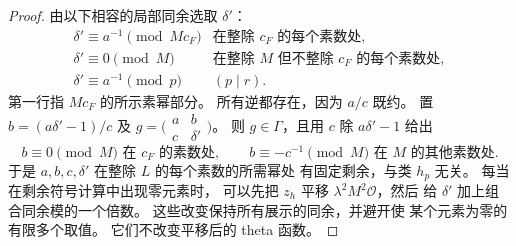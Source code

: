\begin{proof}
由以下相容的局部同余选取 $\delta'$：
\[
 \begin{array}{ll}
 \delta'\equiv a^{-1}\pmod{Mc_F}
       &\text{在整除 }c_F\text{ 的每个素数处},\\
 \delta'\equiv0\pmod M
       &\text{在整除 }M\text{ 但不整除 }c_F\text{ 的每个素数处},\\
 \delta'\equiv a^{-1}\pmod p& (p\mid r).
 \end{array}
\]
第一行指 $Mc_F$ 的所示素幂部分。
所有逆都存在，因为 $a/c$ 既约。 置
$b=(a\delta'-1)/c$ 及 $g=\bigl(\begin{smallmatrix}a&b\\c&\delta'\end{smallmatrix}\bigr)$。
则 $g\in\Gamma$，且用 $c$ 除 $a\delta'-1$ 给出
\[
 b\equiv0\pmod M\text{ 在 }c_F\text{ 的素数处},\qquad
 b\equiv-c^{-1}\pmod M\text{ 在 }M\text{ 的其他素数处}.
\]
于是 $a,b,c,\delta'$ 在整除 $L$ 的每个素数的所需幂处
有固定剩余，与类 $h_p$ 无关。
每当在剩余符号计算中出现零元素时，
可以先把 $z_h$ 平移 $\lambda^2M^2\mathcal O$，然后
给 $\delta'$ 加上组合同余模的一个倍数。
这些改变保持所有展示的同余，并避开使
某个元素为零的有限多个取值。 它们不改变平移后的
theta 函数。


\end{proof}

